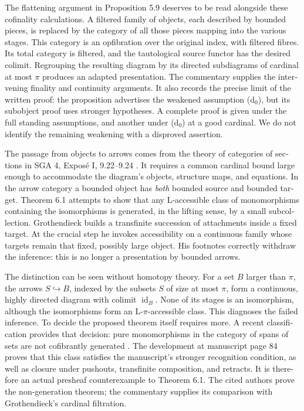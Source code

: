 \begin{otherlanguage}{english}
\begin{otherlanguage}{english}
The flattening argument in Proposition 5.9 deserves to be read alongside these cofinality calculations. A filtered family of objects, each described by bounded pieces, is replaced by the category of all those pieces mapping into the various stages. This category is an opfibration over the original index, with filtered fibres. Its total category is filtered, and the tautological source functor has the desired colimit. Regrouping the resulting diagram by its directed subdiagrams of cardinal at most $\pi$ produces an adapted presentation. The commentary supplies the intervening finality and continuity arguments. It also records the precise limit of the written proof: the proposition advertises the weakened assumption (d$_0$), but its subobject proof uses stronger hypotheses. A complete proof is given under the full standing assumptions, and another under (d$_0$) at a good cardinal. We do not identify the remaining weakening with a disproved assertion.

The passage from objects to arrows comes from the theory of categories of sections in SGA 4, Expos\'e I, 9.22--9.24 \citep{SGA4I1972}. It requires a common cardinal bound large enough to accommodate the diagram's objects, structure maps, and equations. In the arrow category a bounded object has \emph{both} bounded source and bounded target. Theorem 6.1 attempts to show that any L-accessible class of monomorphisms containing the isomorphisms is generated, in the lifting sense, by a small subcollection. Grothendieck builds a transfinite succession of attachments inside a fixed target. At the crucial step he invokes accessibility on a continuous family whose targets remain that fixed, possibly large object. His footnotes correctly withdraw the inference: this is no longer a presentation by bounded arrows.

The distinction can be seen without homotopy theory. For a set $B$ larger than $\pi$, the arrows $S\hookrightarrow B$, indexed by the subsets $S$ of size at most $\pi$, form a continuous, highly directed diagram with colimit $\operatorname{id}_B$. None of its stages is an isomorphism, although the isomorphisms form an L-$\pi$-accessible class. This diagnoses the failed inference. To decide the proposed theorem itself requires more. A recent classification provides that decision: pure monomorphisms in the category of spans of sets are not cofibrantly generated \citep[Theorem 5.1]{CoxFeigertKamsmaMazariArmidaRosicky2026}. The development at manuscript page 84 proves that this class satisfies the manuscript's stronger recognition condition, as well as closure under pushouts, transfinite composition, and retracts. It is therefore an actual presheaf counterexample to Theorem 6.1. The cited authors prove the non-generation theorem; the commentary supplies its comparison with Grothendieck's cardinal filtration.


\end{otherlanguage}
\end{otherlanguage}
